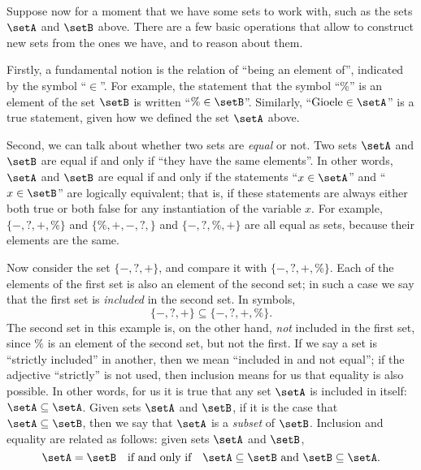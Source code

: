 {

\

Suppose now for a moment that we have some sets to work with, such as the sets $\setA$ and $\setB$ above. There are a few basic operations that allow to construct new sets from the ones we have, and to reason about them. 


Firstly, a fundamental notion is the relation of ``being an element of'', indicated by the symbol ``$\in$''. For example, the statement that the symbol ``$\%$'' is an element of the set $\setB$ is written ``$\% \in \setB$''. Similarly, ``$\text{Gioele} \in \setA$'' is a true statement, given how we defined the set $\setA$ above. 

Second, we can talk about whether two sets are \emph{equal} or not. Two sets $\setA$ and $\setB$ are equal if and only if ``they have the same elements''. In other words, $\setA$ and $\setB$ are equal if and only if the statements
``$x \in \setA$'' and  ``$x \in \setB$'' are logically equivalent; that is, if these statements are always either both true or both false for any instantiation of the variable $x$. For example, $\{ -, ?, +, \% \}$ and $\{ \%, +, -, ?, \}$ and $\{ -, ?, \%, + \}$ are all equal as sets, because their elements are the same. 

Now consider the set $\{ -, ?, + \}$, and compare it with $\{ -, ?, +, \% \}$. Each of the elements of the first set is also an element of the second set; in such a case we say that the first set is \emph{included} in the second set. In symbols,
\begin{equation}
\{ -, ?, + \} \subseteq \{ -, ?, +, \% \}. 
\end{equation}
The second set in this example is, on the other hand, \emph{not} included in the first set, since $\%$ is an element of the second set, but not the first. If we say a set is ``strictly included'' in another, then we mean ``included in and not equal''; if the adjective ``strictly'' is not used, then inclusion means for us that equality is also possible. In other words, for us it is true that any set $\setA$ is included in itself: $\setA \subseteq \setA$. Given sets $\setA$ and $\setB$, if it is the case that $\setA \subseteq \setB$, then we say that $\setA$ is a \emph{subset} of $\setB$. Inclusion and equality are related as follows: given sets $\setA$ and $\setB$, 
\begin{equation}
\setA = \setB \quad \text{if and only if} \quad \setA \subseteq \setB \ \text{and} \ \setB \subseteq \setA.
\end{equation}

}
